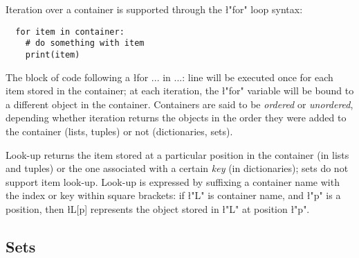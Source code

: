 Iteration over a container is supported through the \l"for" loop
syntax:
\begin{lstlisting}
  for item in container:
    # do something with item
    print(item)
\end{lstlisting}
The block of code following a \l{for ... in ...:} line will be
executed once for each item stored in the container; at each
iteration, the \l"for" variable will be bound to a different object in
the container.  Containers are said to be \emph{ordered} or
\emph{unordered}, depending whether iteration returns the objects in
the order they were added to the container (lists, tuples) or not
(dictionaries, sets).

Look-up returns the item stored at a particular position in the
container (in lists and tuples) or the one associated with a certain
\emph{key} (in dictionaries); sets do not support item look-up.  
Look-up is expressed by suffixing a container name with the index or key
within square brackets: if \l"L" is container name, and \l"p" is a
position, then \l{L[p]} represents the object stored in \l"L" at
position \l"p".

\subsection{Sets}
\label{sec:sets}


